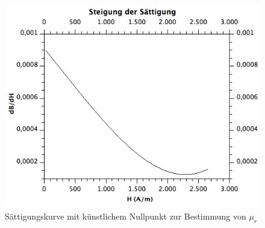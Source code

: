 \documentclass[12pt,a4paper]{article}
\begin{document}
\begin{figure}[H]
	\centering
	\includegraphics[scale=0.6]{./figures/Trafo_W_saettigung-steigung.png}
	\caption{Sättigungskurve mit künstlichem Nullpunkt zur Bestimmung von $\mu_r$}
	\label{fig:Trafo_W_saettigung}
\end{figure}
\end{document}

